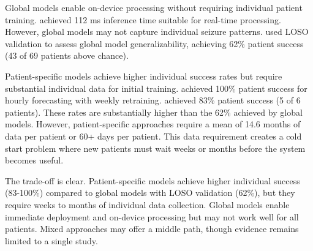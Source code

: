 Global models enable on-device processing without requiring individual patient training. \textcite{spahrDeepLearningbasedDetection2025} achieved 112 ms inference time suitable for real-time processing. However, global models may not capture individual seizure patterns. \textcite{meiselMachineLearningWristband2020} used LOSO validation to assess global model generalizability, achieving 62\% patient success (43 of 69 patients above chance).

Patient-specific models achieve higher individual success rates but require substantial individual data for initial training. \textcite{stirlingForecastingSeizureLikelihood2021} achieved 100\% patient success for hourly forecasting with weekly retraining. \textcite{nasseriAmbulatorySeizureForecasting2021} achieved 83\% patient success (5 of 6 patients). These rates are substantially higher than the 62\% achieved by global models. However, patient-specific approaches require a mean of 14.6 months of data per patient or 60+ days per patient. This data requirement creates a cold start problem where new patients must wait weeks or months before the system becomes useful.

The trade-off is clear. Patient-specific models achieve higher individual success (83-100\%) compared to global models with LOSO validation (62\%), but they require weeks to months of individual data collection. Global models enable immediate deployment and on-device processing but may not work well for all patients. Mixed approaches may offer a middle path, though evidence remains limited to a single study.
